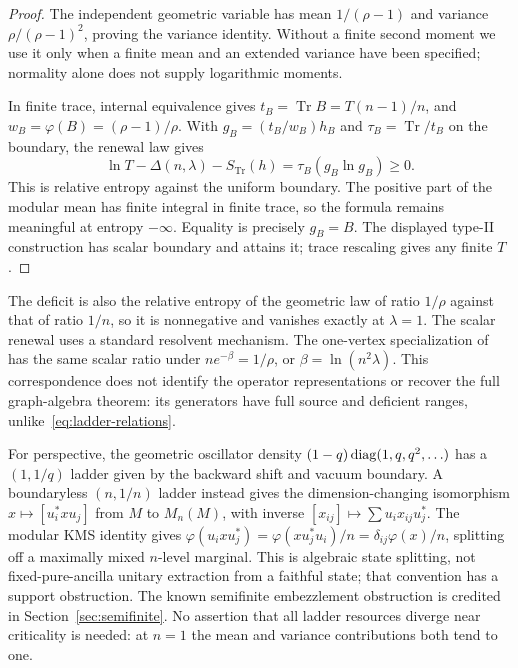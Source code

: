\begin{proof}
The independent geometric variable has mean $1/(\rho-1)$ and variance $\rho/(\rho-1)^2$, proving the variance identity. Without a finite second moment we use it only when a finite mean and an extended variance have been specified; normality alone does not supply logarithmic moments.

In finite trace, internal equivalence gives $t_B=\operatorname{Tr}B=T(n-1)/n$, and $w_B=\varphi(B)=(\rho-1)/\rho$. With $g_B=(t_B/w_B)h_B$ and $\tau_B=\operatorname{Tr}/t_B$ on the boundary, the renewal law gives
\[
 \ln T-\Delta(n,\lambda)-S_{\operatorname{Tr}}(h)
       =\tau_B(g_B\ln g_B)\ge0.
\]
This is relative entropy against the uniform boundary. The positive part of the modular mean has finite integral in finite trace, so the formula remains meaningful at entropy $-\infty$. Equality is precisely $g_B=B$. The displayed type-II construction has scalar boundary and attains it; trace rescaling gives any finite $T$.
\end{proof}

The deficit is also the relative entropy of the geometric law of ratio $1/\rho$ against that of ratio $1/n$, so it is nonnegative and vanishes exactly at $\lambda=1$. The scalar renewal uses a standard resolvent mechanism. The one-vertex specialization of~\cite[Theorem 3.1]{aHLRS} has the same scalar ratio under $n e^{-\beta}=1/\rho$, or $\beta=\ln(n^2\lambda)$. This correspondence does not identify the operator representations or recover the full graph-algebra theorem: its generators have full source and deficient ranges, unlike~\eqref{eq:ladder-relations}.

For perspective, the geometric oscillator density $(1-q)\operatorname{diag}(1,q,q^2,\ldots)$ has a $(1,1/q)$ ladder given by the backward shift and vacuum boundary. A boundaryless $(n,1/n)$ ladder instead gives the dimension-changing isomorphism $x\mapsto[u_i^*xu_j]$ from $M$ to $M_n(M)$, with inverse $[x_{ij}]\mapsto\sum u_i x_{ij}u_j^*$. The modular KMS identity gives $\varphi(u_i x u_j^*)=\varphi(xu_j^*u_i)/n=\delta_{ij}\varphi(x)/n$, splitting off a maximally mixed $n$-level marginal. This is algebraic state splitting, not fixed-pure-ancilla unitary extraction from a faithful state; that convention has a support obstruction. The known semifinite embezzlement obstruction is credited in Section~\ref{sec:semifinite}. No assertion that all ladder resources diverge near criticality is needed: at $n=1$ the mean and variance contributions both tend to one.

